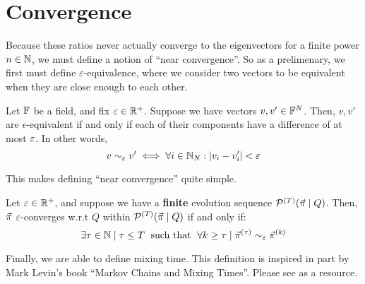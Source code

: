 \section{Convergence}

Because these ratios never actually converge to the eigenvectors for a finite power $n \in \mathbb{N}$, we must define a notion of ``near convergence''.
So as a prelimenary, we first must define $\varepsilon$-equivalence, where we consider two vectors to be equivalent when they are close enough to each other.

\begin{definition}
Let $\mathbb{F}$ be a field, and fix $\varepsilon \in \mathbb{R}^+$. Suppose we have vectors $v, v' \in \mathbb{F}^N$.
Then, $v, v'$ are $\epsilon$-equivalent if and only if each of their components have a difference of at most $\varepsilon$.
In other words,
$$v \sim_\varepsilon v' \iff \forall i \in \mathbb{N}_N: |v_i - v'_i| < \varepsilon$$
\end{definition}




This makes defining ``near convergence'' quite simple.

\begin{definition}
Let $\varepsilon \in \mathbb{R}^+$, and suppose we have a \textbf{finite} evolution sequence $\mathcal{P}^{(T)}(\vec{\pi} \mid Q)$.
Then, $\vec{\pi}$ $\varepsilon$-converges w.r.t $Q$ within $\mathcal{P}^{(T)}(\vec{\pi} \mid Q)$ if and only if:
$$ \exists \tau \in \mathbb{N} \mid \tau \leq T \text{\; such that \;} \forall k \geq \tau \mid \vec{\pi}^{(\tau)} \sim_\varepsilon \vec{\pi}^{(k)}$$
\end{definition}

Finally, we are able to define mixing time.
This definition is inspired in part by Mark Levin's book ``Markov Chains and Mixing Times''.
Please see \cite{levin} as a resource.

